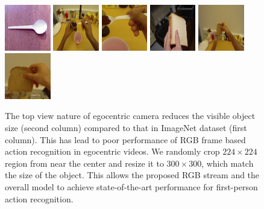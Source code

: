 \documentclass{article}
\begin{document}
\begin{figure}[t]
\begin{center}
{\includegraphics[width=0.30\linewidth , height=20mm]{spoon_imagenet}}
{\includegraphics[width=0.30\linewidth, height=20mm]{spoon_CofHoney}}
{\includegraphics[width=0.30\linewidth, height=20mm]{resized_spoon}}
{\includegraphics[width=0.30\linewidth, height=20mm]{bread_image_net}}
{\includegraphics[width=0.30\linewidth, height=20mm]{bread_S1CheeseC1}}
{\includegraphics[width=0.30\linewidth, height=20mm]{resized_bread}}
\end{center}
\caption{The top view nature of egocentric camera reduces the visible object size (second column) compared to that in ImageNet dataset \cite{russakovsky2015imagenet} (first column). This has lead to poor performance of RGB frame based action recognition in egocentric videos. We randomly crop $224\times224$ region from near the center and resize it to $300 \times 300$, which match the size of the object. This allows the proposed RGB stream and the overall model to achieve state-of-the-art performance for first-person action recognition.}
\end{figure}
\end{document}
